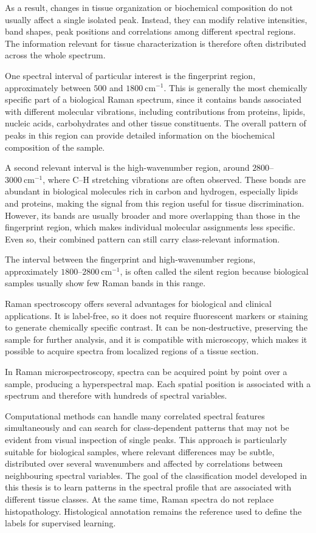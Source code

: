 As a result, changes in tissue organization or biochemical composition do not usually affect a single isolated peak. Instead, they can modify relative intensities, band shapes, peak positions and correlations among different spectral regions. The information relevant for tissue characterization is therefore often distributed across the whole spectrum.

One spectral interval of particular interest is the fingerprint region, approximately between \(500\) and \(1800~\mathrm{cm}^{-1}\). This is generally the most chemically specific part of a biological Raman spectrum, since it contains bands associated with different molecular vibrations, including contributions from proteins, lipids, nucleic acids, carbohydrates and other tissue constituents. The overall pattern of peaks in this region can provide detailed information on the biochemical composition of the sample.

A second relevant interval is the high-wavenumber region, around \(2800\)--\(3000~\mathrm{cm}^{-1}\), where C--H stretching vibrations are often observed. These bonds are abundant in biological molecules rich in carbon and hydrogen, especially lipids and proteins, making the signal from this region useful for tissue discrimination. However, its bands are usually broader and more overlapping than those in the fingerprint region, which makes individual molecular assignments less specific. Even so, their combined pattern can still carry class-relevant information.

The interval between the fingerprint and high-wavenumber regions, approximately \(1800\)--\(2800~\mathrm{cm}^{-1}\), is often called the silent region because biological samples usually show few Raman bands in this range.

Raman spectroscopy offers several advantages for biological and clinical applications. It is label-free, so it does not require fluorescent markers or staining to generate chemically specific contrast. It can be non-destructive, preserving the sample for further analysis, and it is compatible with microscopy, which makes it possible to acquire spectra from localized regions of a tissue section.

In Raman microspectroscopy, spectra can be acquired point by point over a sample, producing a hyperspectral map. Each spatial position is associated with a spectrum and therefore with hundreds of spectral variables. 

Computational methods can handle many correlated spectral features simultaneously and can search for class-dependent patterns that may not be evident from visual inspection of single peaks. This approach is particularly suitable for biological samples, where relevant differences may be subtle, distributed over several wavenumbers and affected by correlations between neighbouring spectral variables. 
The goal of the classification model developed in this thesis is to learn patterns in the spectral profile that are associated with different tissue classes. At the same time, Raman spectra do not replace histopathology. Histological annotation remains the reference used to define the labels for supervised learning.

